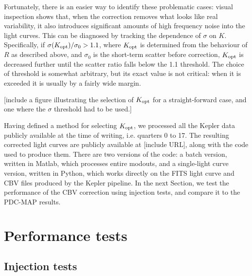 \documentclass[useAMS,usenatbib]{mn2e}
\begin{document}
Fortunately, there is an easier way to
identify these problematic cases: visual inspection shows that, when
the correction removes what looks like real variability, it also
introduces significant amounts of high frequency noise into the light curves. This can be
diagnosed by tracking the dependence of $\sigma$ on $K$. Specifically, if
$\sigma(K_{\rm opt})/\sigma_0>1.1 $, where $K_{\rm opt}$ is determined
from the behaviour of $R$ as described above, and $\sigma_0$ is the
short-term scatter before correction, $K_{\rm opt}$ is decreased further
until the scatter ratio falls below the 1.1 threshold. The choice of
threshold is somewhat arbitrary, but its exact value is not
critical: when it is exceeded it is usually by a fairly wide margin.

[include a figure illustrating the selection of $K_{\rm opt}$ for a
straight-forward case, and one where the $\sigma$ threshold had to be
used.]

Having defined a method for selecting $K_{\rm opt}$, we processed
all the Kepler data publicly available at the time of writing,
i.e. quarters 0 to 17. The resulting corrected light curves are
publicly available at [include URL], along with the code used to
produce them. There are two versions of the code: a batch version,
written in {\sc Matlab}, which processes entire modouts, and a
single-light curve version, written in {\sc Python}, which works
directly on the FITS light curve and CBV files produced by the Kepler
pipeline. In the next Section, we test the performance of the CBV
correction using injection tests, and compare it to the PDC-MAP
results.

\section{Performance tests}
\label{sec:tests}

\subsection{Injection tests}
\label{sec:inject}
\end{document}
